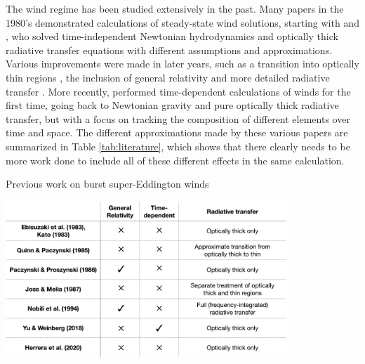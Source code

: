 \documentclass[../main.tex]{subfiles}
\begin{document}
The wind regime has been studied extensively in the past. Many papers in the 1980's demonstrated calculations of steady-state wind solutions, starting with \citet{Ebisuzaki1983} and \citet{Kato1983a}, who solved time-independent Newtonian hydrodynamics and optically thick radiative transfer equations with different assumptions and approximations.  Various improvements were made in later years, such as a transition into optically thin regions \citep{Quinn1985}, the inclusion of general relativity \citep{Paczynski1986b} and more detailed radiative transfer \citep{Joss1987,Nobili1994}.  More recently, \citet{YuHangWeinberg2018} performed time-dependent calculations of winds for the first time, going back to Newtonian gravity and pure optically thick radiative transfer, but with a focus on tracking the composition of different elements over time and space.  The different approximations made by these various papers are summarized in Table \ref{tab:literature}, which shows that there clearly needs to be more work done to include all of these different effects in the same calculation.

\begin{table}[ht!]
    \centering
    \caption{Previous work on burst super-Eddington winds}
    \vspace*{3mm}
    \includegraphics[width=0.8\textwidth]{figures/table.png}
    \label{tab:literature}
\end{table}
\end{document}
